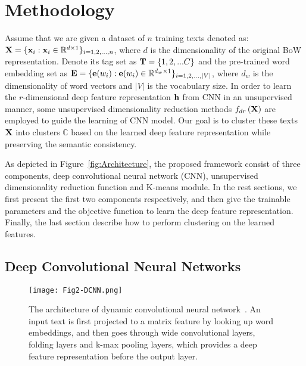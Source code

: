\documentclass[review]{elsarticle}
\begin{document}


\section{Methodology}
\label{sec:Methodology}
  Assume that we are given a dataset of \(n\) training texts denoted as: \({\bf{X}} = {\{ {{\bf{x}}_i}:{{\bf{x}}_i} \in {\mathbb{R}^{d \times 1}}\} _{i = 1,2,...,n}}\), where \(d\) is the dimensionality of the original BoW representation. Denote its tag set as \({\bf{T}} = \{ 1,2,...C\} \) and the pre-trained word embedding set as \({\bf{E}} = {\{ {\bf{e}}({w_i}):{\bf{e}}({w_i}) \in {\mathbb{R}^{{d_w} \times 1}}\} _{i = 1,2,...,|V|}}\), where \(d_w\) is the dimensionality of word vectors and $|V|$ is the vocabulary size. In order to learn the \(r\)-dimensional deep feature representation \({\bf{h}}\) from CNN in an unsupervised manner, some unsupervised dimensionality reduction methods \({f_{dr}}\left( {\bf{X}} \right)\) are employed to guide the learning of CNN model. Our goal is to cluster these texts \({\bf{X}}\) into clusters \(\mathbb{C}\) based on the learned deep feature representation while preserving the semantic consistency.

As depicted in Figure~\ref{fig:Architecture}, the proposed framework consist of three components, deep convolutional neural network (CNN), unsupervised dimensionality reduction function and K-means module. In the rest sections, we first present the first two components respectively, and then give the trainable parameters and the objective function to learn the deep feature representation. Finally, the last section describe how to perform clustering on the learned features.

\subsection{Deep Convolutional Neural Networks}


\begin{figure}[t]
\begin{center}
\texttt{[image: Fig2-DCNN.png]}
\caption{The architecture of dynamic convolutional neural network~\cite{16_blunsom2014convolutional}. An input text is first projected to a matrix feature by looking up word embeddings, and then goes through wide convolutional layers, folding layers and k-max pooling layers, which provides a deep feature representation before the output layer.}\label{fig:DCNN}
\end{center}
\end{figure}
\end{document}
